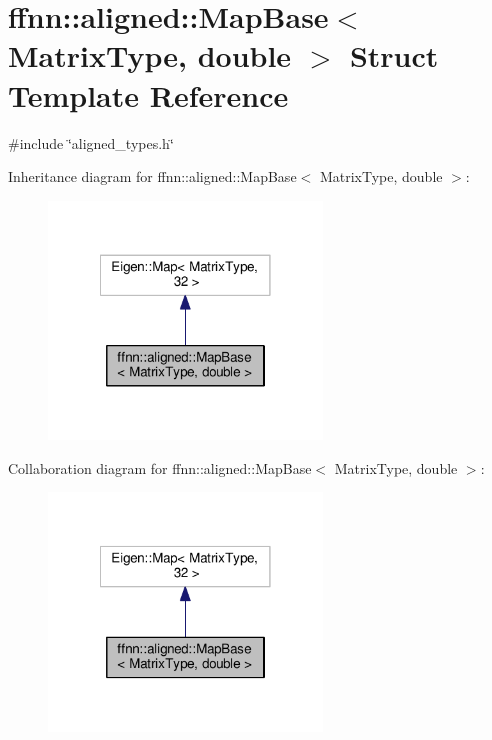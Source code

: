 \hypertarget{structffnn_1_1aligned_1_1_map_base_3_01_matrix_type_00_01double_01_4}{\section{ffnn\-:\-:aligned\-:\-:Map\-Base$<$ Matrix\-Type, double $>$ Struct Template Reference}
\label{structffnn_1_1aligned_1_1_map_base_3_01_matrix_type_00_01double_01_4}
}


{\ttfamily \#include \char`\"{}aligned\-\_\-types.\-h\char`\"{}}



Inheritance diagram for ffnn\-:\-:aligned\-:\-:Map\-Base$<$ Matrix\-Type, double $>$\-:\nopagebreak
\begin{figure}[H]
\begin{center}
\leavevmode
\includegraphics[width=206pt]{structffnn_1_1aligned_1_1_map_base_3_01_matrix_type_00_01double_01_4__inherit__graph}
\end{center}
\end{figure}


Collaboration diagram for ffnn\-:\-:aligned\-:\-:Map\-Base$<$ Matrix\-Type, double $>$\-:\nopagebreak
\begin{figure}[H]
\begin{center}
\leavevmode
\includegraphics[width=206pt]{structffnn_1_1aligned_1_1_map_base_3_01_matrix_type_00_01double_01_4__coll__graph}
\end{center}
\end{figure}
